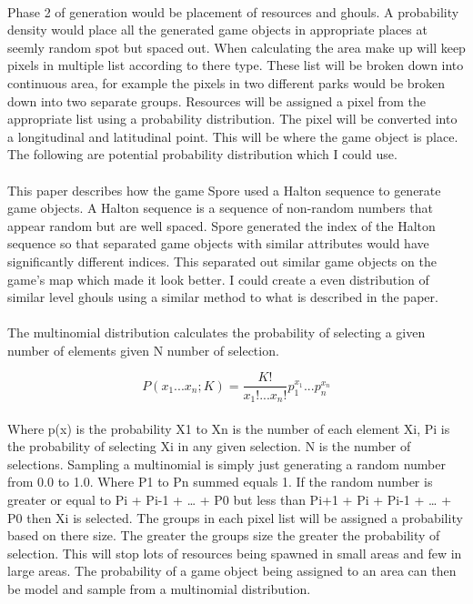 \documentclass{article}
\begin{document}
		\paragraph{}Phase 2 of generation would be placement of resources and ghouls. A probability density would place all the generated game objects in appropriate places at seemly random spot but spaced out. When calculating the area make up will keep pixels in multiple list according to there type. These list will be broken down into continuous area, for example the pixels in two different parks would be broken down into two separate groups. Resources will be assigned a pixel from the appropriate list using a probability distribution. The pixel will be converted into a longitudinal and latitudinal point. This will be where the game object is place. The following are potential probability distribution which I could use. 
		
		\paragraph{}This paper \cite{Willmott:2007} describes how the game Spore \cite{Spore} used a Halton sequence to generate game objects. A Halton sequence is a sequence of non-random numbers that appear random but are well spaced. Spore generated the index of the Halton sequence so that separated game objects with similar attributes would have significantly different indices. This separated out similar game objects on the game's map which made it look better. I could create a even distribution of similar level ghouls using a similar method to what is described in the paper.
		
		\paragraph{}The multinomial distribution calculates the probability of selecting a given number of elements given N number of selection. 
		
		\begin{equation}
			P(x_1...x_n;K) = \frac{K!}{x_1!...x_n!} p_1^{x_1} ... p_n^{x_n}
		\end{equation}
		
		\paragraph{}Where p(x) is the probability X1 to Xn is the number of each element Xi, Pi is the probability of selecting Xi in any given selection. N is the number of selections. Sampling a multinomial is simply just generating a random number from 0.0 to 1.0. Where P1 to Pn summed equals 1. If the random number is greater or equal to Pi + Pi-1 + … + P0 but less than Pi+1 + Pi + Pi-1 + … + P0 then Xi is selected. The groups in each pixel list will be assigned a probability based on there size. The greater the groups size the greater the probability of selection. This will stop lots of resources being spawned in small areas and few in large areas. The probability of a game object being assigned to an area can then be model and sample from a multinomial distribution. 
		
\end{document}
